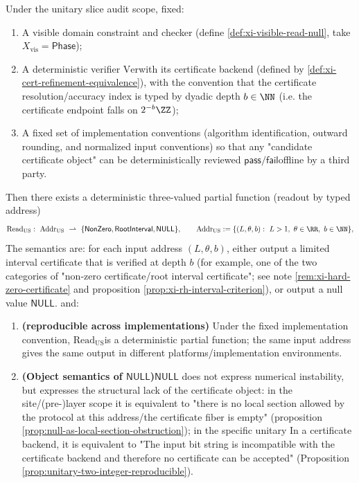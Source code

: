 \begin{theorem}\label{thm:xi-us-deterministic-tristate}
Under the unitary slice audit scope, fixed:
\begin{enumerate}
  \item A visible domain constraint and checker (define \ref{def:xi-visible-read-null}, take \(X_{\mathrm{vis}}=\mathsf{Phase}\));
  \item A deterministic verifier \(\mathrm{Ver}\) ​​with its certificate backend (defined by \ref{def:xi-cert-refinement-equivalence}), with the convention that the certificate resolution/accuracy index is typed by dyadic depth \(b\in\NN\) (i.e. the certificate endpoint falls on \(2^{-b}\ZZ\));
  \item A fixed set of implementation conventions (algorithm identification, outward rounding, and normalized input conventions) so that any "candidate certificate object" can be deterministically reviewed \(\mathsf{pass}/\mathsf{fail}\) ​​offline by a third party.
\end{enumerate}
Then there exists a deterministic three-valued partial function (readout by typed address)
\[
\mathrm{Read}_{\mathrm{US}}:\ \mathrm{Addr}_{\mathrm{US}}\ \rightharpoonup\ \{\mathsf{NonZero},\mathsf{RootInterval},\mathsf{NULL}\},
\qquad
\mathrm{Addr}_{\mathrm{US}}:=\{(L,\theta,b):\ L>1,\ \theta\in\RR,\ b\in\NN\},
\]
The semantics are: for each input address \((L,\theta,b)\), either output a limited interval certificate that is verified at depth \(b\) (for example, one of the two categories of "non-zero certificate/root interval certificate"; see note \ref{rem:xi-hard-zero-certificate} and proposition \ref{prop:xi-rh-interval-criterion}), or output a null value \(\mathsf{NULL}\).
and:
\begin{enumerate}
  \item \textbf{(reproducible across implementations)} Under the fixed implementation convention, \(\mathrm{Read}_{\mathrm{US}}\) ​​is a deterministic partial function; the same input address gives the same output in different platforms/implementation environments.
  \item \textbf{(Object semantics of \(\mathsf{NULL}\))}\(\mathsf{NULL}\) does not express numerical instability, but expresses the structural lack of the certificate object: in the site/(pre-)layer scope it is equivalent to "there is no local section allowed by the protocol at this address/the certificate fiber is empty" (proposition \ref{prop:null-as-local-section-obstruction}); in the specific unitary In a certificate backend, it is equivalent to "The input bit string is incompatible with the certificate backend and therefore no certificate can be accepted" (Proposition \ref{prop:unitary-two-integer-reproducible}).
\end{enumerate}
\end{theorem}

